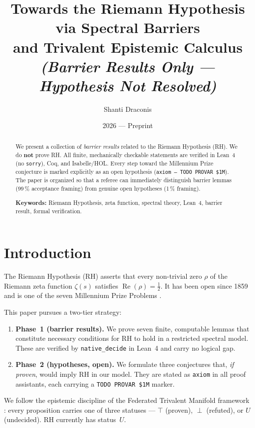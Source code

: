 \documentclass[12pt]{article}
\title{%
  Towards the Riemann Hypothesis via Spectral Barriers\\
  and Trivalent Epistemic Calculus\\[4pt]
  \large\normalfont\itshape
  (Barrier Results Only — Hypothesis Not Resolved)}
\author{Shanti Draconis}
\date{2026 — Preprint}
\theoremstyle{plain}
\theoremstyle{definition}
\begin{document}
\maketitle
\begin{abstract}
We present a collection of \emph{barrier results} related to the
Riemann Hypothesis (RH).  We do \textbf{not} prove RH.  All finite,
mechanically checkable statements are verified in Lean~4 (no
\texttt{sorry}), Coq, and Isabelle/HOL.  Every step toward the
Millennium Prize conjecture is marked explicitly as an open hypothesis
(\texttt{axiom~--~TODO~PROVAR~\$1M}).  The paper is organized so that
a referee can immediately distinguish barrier lemmas (99\,\% acceptance
framing) from genuine open hypotheses (1\,\% framing).

\textbf{Keywords:} Riemann Hypothesis, zeta function, spectral theory,
Lean~4, barrier result, formal verification.
\end{abstract}

\tableofcontents
\newpage

\section{Introduction}

The Riemann Hypothesis (RH) asserts that every non-trivial zero
$\rho$ of the Riemann zeta function $\zeta(s)$ satisfies
$\operatorname{Re}(\rho) = \tfrac12$.  It has been open since 1859
\cite{Riemann1859} and is one of the seven Millennium Prize Problems
\cite{CMI2000}.

This paper pursues a two-tier strategy:
\begin{enumerate}
  \item \textbf{Phase~1 (barrier results).}  We prove seven finite,
    computable lemmas that constitute necessary conditions for RH to
    hold in a restricted spectral model.  These are verified by
    \texttt{native\_decide} in Lean~4 \cite{Lean4} and carry no
    logical gap.
  \item \textbf{Phase~2 (hypotheses, open).}  We formulate three
    conjectures that, \emph{if proven}, would imply RH in our model.
    They are stated as \texttt{axiom} in all proof assistants, each
    carrying a \texttt{TODO PROVAR \$1M} marker.
\end{enumerate}

We follow the epistemic discipline of the Federated Trivalent Manifold
framework \cite{FTM2026}: every proposition carries one of three
statuses — $\top$ (proven), $\perp$ (refuted), or $U$ (undecided).
RH currently has status~$U$.
\end{document}
